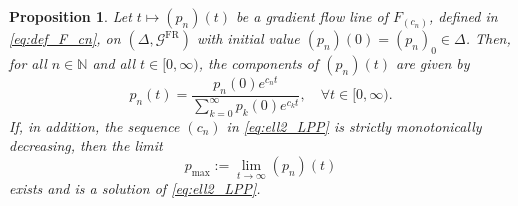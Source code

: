 \documentclass[12pt]{amsart}
\newtheorem{proposition}[proposition]{Proposition}
\numberwithin{figure}{section}
\numberwithin{table}{section}
\numberwithin{equation}{section}
\begin{document}
\begin{proposition}
\label{prop:integral-curves}
Let \(t \mapsto (p_n)(t)\) be a gradient flow line of \(F_{(c_n)}\), defined in \eqref{eq:def_F_cn}, on \((\Delta,\mathcal{G}^{\mathrm{FR}})\) with initial value \((p_n)(0) = (p_n)_0 \in \Delta\). Then, for all \(n \in \mathbb{N}\) and all \(t \in [0,\infty)\), the components of \((p_n)(t)\) are given by
\begin{equation}\label{eq:integral-curves}
	p_n(t)=\frac{p_n(0)e^{c_n t}}{\sum_{k=0}^{\infty} p_k(0)e^{c_k t}},\quad \forall t\in [0,\infty).
\end{equation}
If, in addition, the sequence \((c_n)\) in \eqref{eq:ell2_LPP} is strictly monotonically decreasing, then the limit
\[
p_{\max}:=\lim_{t\to\infty}(p_n)(t)
\]
exists and is a solution of \eqref{eq:ell2_LPP}.
\end{proposition}
\end{document}
